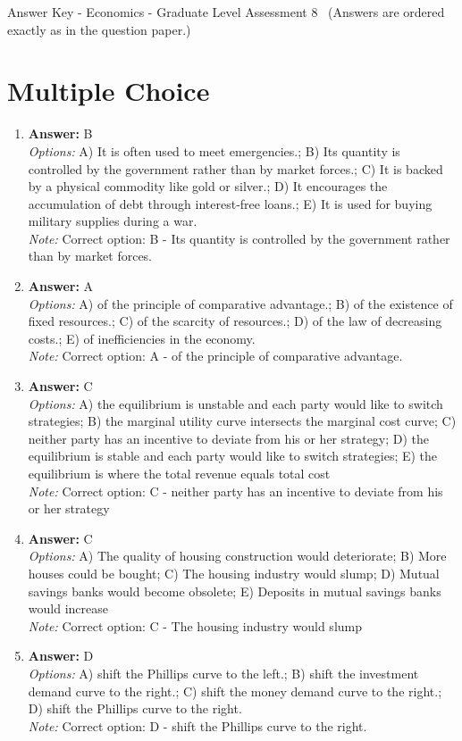 \documentclass[12pt]{article}
\begin{document}
\begin{center}
Answer Key - Economics - Graduate Level Assessment 8 \
\small (Answers are ordered exactly as in the question paper.)
\end{center}

\section*{Multiple Choice}
\begin{enumerate}[label=\arabic*.]
\item \textbf{Answer:} B
\\ \textit{Options:} A) It is often used to meet emergencies.; B) Its quantity is controlled by the government rather than by market forces.; C) It is backed by a physical commodity like gold or silver.; D) It encourages the accumulation of debt through interest-free loans.; E) It is used for buying military supplies during a war.
\\ \textit{Note:} Correct option: B - Its quantity is controlled by the government rather than by market forces.
\item \textbf{Answer:} A
\\ \textit{Options:} A) of the principle of comparative advantage.; B) of the existence of fixed resources.; C) of the scarcity of resources.; D) of the law of decreasing costs.; E) of inefficiencies in the economy.
\\ \textit{Note:} Correct option: A - of the principle of comparative advantage.
\item \textbf{Answer:} C
\\ \textit{Options:} A) the equilibrium is unstable and each party would like to switch strategies; B) the marginal utility curve intersects the marginal cost curve; C) neither party has an incentive to deviate from his or her strategy; D) the equilibrium is stable and each party would like to switch strategies; E) the equilibrium is where the total revenue equals total cost
\\ \textit{Note:} Correct option: C - neither party has an incentive to deviate from his or her strategy
\item \textbf{Answer:} C
\\ \textit{Options:} A) The quality of housing construction would deteriorate; B) More houses could be bought; C) The housing industry would slump; D) Mutual savings banks would become obsolete; E) Deposits in mutual savings banks would increase
\\ \textit{Note:} Correct option: C - The housing industry would slump
\item \textbf{Answer:} D
\\ \textit{Options:} A) shift the Phillips curve to the left.; B) shift the investment demand curve to the right.; C) shift the money demand curve to the right.; D) shift the Phillips curve to the right.
\\ \textit{Note:} Correct option: D - shift the Phillips curve to the right.
\end{enumerate}
\end{document}
